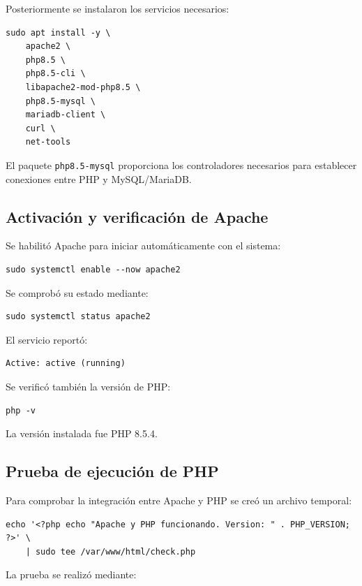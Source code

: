\documentclass[12pt,a4paper]{article}
\begin{document}
Posteriormente se instalaron los servicios
necesarios:

\begin{lstlisting}
sudo apt install -y \
    apache2 \
    php8.5 \
    php8.5-cli \
    libapache2-mod-php8.5 \
    php8.5-mysql \
    mariadb-client \
    curl \
    net-tools
\end{lstlisting}

El paquete \texttt{php8.5-mysql}
proporciona los controladores necesarios
para establecer conexiones entre PHP
y MySQL/MariaDB.

\subsection{Activación y verificación de Apache}

Se habilitó Apache para iniciar
automáticamente con el sistema:

\begin{lstlisting}
sudo systemctl enable --now apache2
\end{lstlisting}

Se comprobó su estado mediante:

\begin{lstlisting}
sudo systemctl status apache2
\end{lstlisting}

El servicio reportó:

\begin{lstlisting}
Active: active (running)
\end{lstlisting}

Se verificó también la versión de PHP:

\begin{lstlisting}
php -v
\end{lstlisting}

La versión instalada fue PHP 8.5.4.

\subsection{Prueba de ejecución de PHP}

Para comprobar la integración entre
Apache y PHP se creó un archivo temporal:

\begin{lstlisting}
echo '<?php echo "Apache y PHP funcionando. Version: " . PHP_VERSION; ?>' \
    | sudo tee /var/www/html/check.php
\end{lstlisting}

La prueba se realizó mediante:
\end{document}
